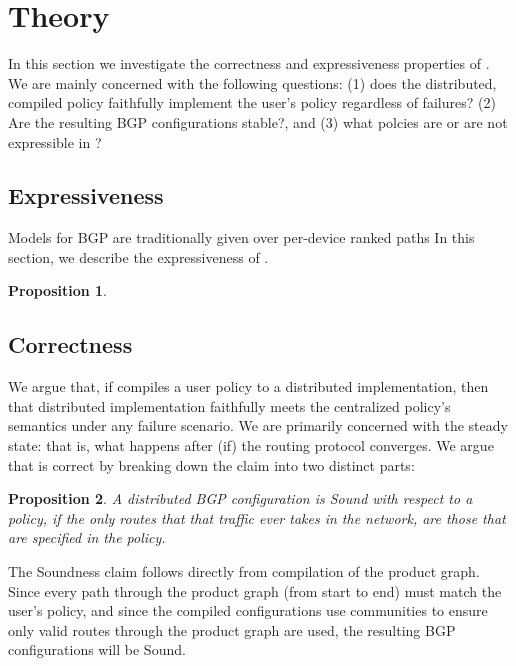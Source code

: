 \section{Theory}

\newtheorem{defn}{Proposition}[section]

In this section we investigate the correctness and expressiveness properties of \sysname. We are mainly concerned with the following questions: (1) does the distributed, compiled policy faithfully implement the user's policy regardless of failures? (2) Are the resulting BGP configurations stable?, and (3) what polcies are or are not expressible in \sysname?

\subsection{Expressiveness}

Models for BGP are traditionally given over per-device ranked paths 
In this section, we describe the expressiveness of \sysname.

\begin{defn}

\end{defn}


\subsection{Correctness}

We argue that, if \sysname compiles a user policy to a distributed implementation, then that distributed implementation faithfully meets the centralized policy's semantics under any failure scenario. We are primarily concerned with the steady state: that is, what happens after (if) the routing protocol converges.  We argue that \sysname is correct by breaking down the claim into two distinct parts:


\begin{defn}
A distributed BGP configuration is \textit{Sound} with respect to a \sysname policy, if the only routes that that traffic ever takes in the network, are those that are specified in the policy.
\end{defn}

The Soundness claim follows directly from compilation of the product graph. Since every path through the product graph (from start to end) must match the user's policy, and since the compiled configurations use communities to ensure only valid routes through the product graph are used, the resulting BGP configurations will be Sound. 

